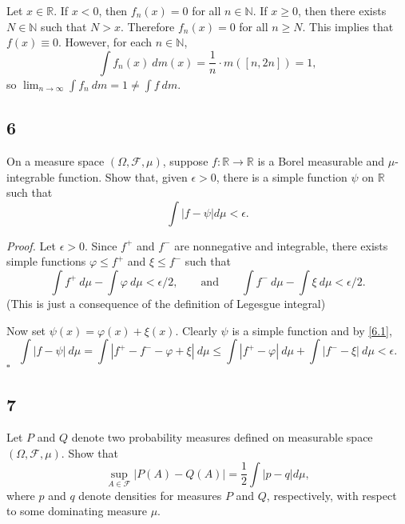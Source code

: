 \documentclass[12pt]{article}
\newcounter{ProofCounter}
\newenvironment{Proof}{\stepcounter{ProofCounter}\textit{Proof.}}{\hfill$\square$}
\begin{document}
Let $x \in \mathbb{R}$. If $x < 0$, then $f_{n}(x) = 0$ for all $n \in \mathbb{N}$. If $x \geq 0$, then there exists $N \in \mathbb{N}$ such that $N >
x$. Therefore $f_{n}(x) = 0$ for all $n \geq N$. This implies that $f(x) \equiv 0$. However, for each $n \in \mathbb{N}$,
\[ \int f_{n}(x) \ dm(x) = \frac{1}{n}\cdot m([n,2n]) = 1, \]
so $\lim_{n\rightarrow\infty} \int f_{n}\ dm = 1 \neq \int f\ dm$.


\subsection*{6}
\begin{tcolorbox}
On a measure space $(\Omega, \mathcal{F}, \mu)$, suppose $f : \mathbb{R} \rightarrow \mathbb{R}$ is a Borel measurable and $\mu$-integrable function.
Show that, given $\epsilon > 0$, there is a simple function $\psi$ on $\mathbb{R}$ such that 
\[ \int |f - \psi | d\mu < \epsilon. \]
\end{tcolorbox}

\begin{Proof}
Let $\epsilon > 0$. Since $f^{+}$ and $f^{-}$ are nonnegative and integrable, there exists simple functions $\varphi \leq f^{+}$ and $\xi \leq
f^{-}$ such that 
\begin{equation}
\int f^{+}\ d\mu - \int \varphi\ d\mu < \epsilon / 2, \qquad \text{and} \qquad \int f^{-}\ d\mu - \int \xi\ d\mu < \epsilon / 2.
\label{6.1}
\end{equation}
(This is just a consequence of the definition of Legesgue integral) 

Now set $\psi(x) = \varphi(x) + \xi(x)$. Clearly $\psi$ is a simple function and by \eqref{6.1},
\[ \int |f - \psi|\ d\mu = \int |f^{+} - f^{-} - \varphi + \xi|\ d\mu \leq \int |f^{+} - \varphi|\ d\mu + \int |f^{-} - \xi|\ d\mu < \epsilon. \]
\end{Proof}


\newpage
\subsection*{7}
\begin{tcolorbox}
Let $P$ and $Q$ denote two probability measures defined on measurable space $(\Omega, \mathcal{F}, \mu)$. Show that 
\[ \sup_{A \in \mathcal{F}}|P(A) - Q(A)| = \frac{1}{2} \int |p - q|d\mu, \]
where $p$ and $q$ denote densities for measures $P$ and $Q$, respectively, with respect to some dominating measure $\mu$.
\end{tcolorbox}
\end{document}
